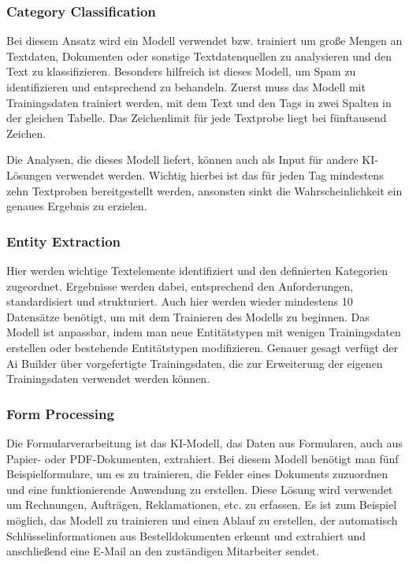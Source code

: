 \subsubsection{Category Classification}

Bei diesem Ansatz wird ein Modell verwendet bzw. trainiert um große Mengen an Textdaten, Dokumenten oder sonstige Textdatenquellen zu analysieren und den Text zu klassifizieren. Besonders hilfreich ist dieses Modell, um Spam zu identifizieren und entsprechend zu behandeln. Zuerst muss das Modell mit Trainingsdaten trainiert werden, mit dem Text und den Tags in zwei Spalten in der gleichen Tabelle. Das Zeichenlimit für jede Textprobe liegt bei fünftausend Zeichen.

Die Analysen, die dieses Modell liefert, können auch als Input für andere KI-Lösungen verwendet werden. Wichtig hierbei ist das für jeden Tag mindestens zehn Textproben bereitgestellt werden, ansonsten sinkt die Wahrscheinlichkeit ein genaues Ergebnis zu erzielen.

\subsubsection{Entity Extraction}

Hier werden wichtige Textelemente identifiziert und den definierten Kategorien zugeordnet. Ergebnisse werden dabei, entsprechend den Anforderungen, standardisiert und strukturiert. Auch hier werden wieder mindestens 10 Datensätze benötigt, um mit dem Trainieren des Modells zu beginnen. Das Modell ist anpassbar, indem man neue Entitätstypen mit wenigen Trainingsdaten erstellen oder bestehende Entitätstypen modifizieren. Genauer gesagt verfügt der Ai Builder über vorgefertigte Trainingsdaten, die zur Erweiterung der eigenen Trainingsdaten verwendet werden können.

\subsubsection{Form Processing}

Die Formularverarbeitung ist das KI-Modell, das Daten aus Formularen, auch aus Papier- oder PDF-Dokumenten, extrahiert. Bei diesem Modell benötigt man fünf Beispielformulare, um es zu trainieren, die Felder eines Dokuments zuzuordnen und eine funktionierende Anwendung zu erstellen. Diese Lösung wird verwendet um Rechnungen, Aufträgen, Reklamationen, etc. zu erfassen. Es ist zum Beispiel möglich, das Modell zu trainieren und einen Ablauf zu erstellen, der automatisch Schlüsselinformationen aus Bestelldokumenten erkennt und extrahiert und anschließend eine E-Mail an den zuständigen Mitarbeiter sendet.

